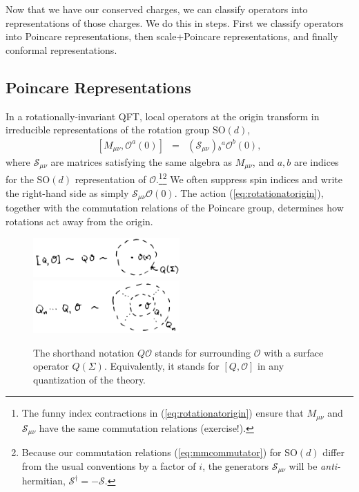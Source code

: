 \documentclass{ws-rv9x6}
\newcommand\be{\begin{eqnarray}}
\newcommand\ee{\end{eqnarray}}
\newcommand\cO{\mathcal{O}}
\newcommand\<\langle
\renewcommand\>\rangle
\renewcommand\.{\cdot}
\newcommand\SO{\mathrm{SO}}
\newcommand\cS{\mathcal{S}}
\begin{document}
Now that we have our conserved charges, we can classify operators into representations of those charges.  We do this in steps. First we classify operators into Poincare representations, then scale+Poincare representations, and finally conformal representations.

\subsection{Poincare Representations}

In a rotationally-invariant QFT, local operators at the origin transform in irreducible representations of the rotation group $\SO(d)$,
\be
\label{eq:rotationatorigin}
[M_{\mu\nu},\cO^a(0)]&=& (\cS_{\mu\nu}){}_b{}^a\cO^b(0),
\ee
where $\cS_{\mu\nu}$ are matrices satisfying the same algebra as $M_{\mu\nu}$, and $a,b$ are indices for the $\SO(d)$ representation of $\cO$.\footnote{The funny index contractions in (\ref{eq:rotationatorigin}) ensure that $M_{\mu\nu}$ and $\cS_{\mu\nu}$ have the same commutation relations (exercise!).}\footnote{Because our commutation relations (\ref{eq:mmcommutator}) for $\SO(d)$ differ from the usual conventions by a factor of $i$, the generators $\cS_{\mu\nu}$ will be {\it anti-}hermitian, $\cS^\dag=-\cS$.}  We often suppress spin indices and write the right-hand side as simply $\cS_{\mu\nu}\cO(0)$. The action (\ref{eq:rotationatorigin}), together with the commutation relations of the Poincare group, determines how rotations act away from the origin.

\begin{figure}
\begin{center}
\includegraphics[width=0.5\textwidth]{commutatorissurround.jpg}
\includegraphics[width=0.5\textwidth]{surroundmany.jpg}
\end{center}
\caption{The shorthand notation $Q\cO$ stands for surrounding $\cO$ with a surface operator $Q(\Sigma)$. Equivalently, it stands for $[Q,\cO]$ in any quantization of the theory. \label{fig:commutatorissurround}}
\end{figure}
\end{document}
